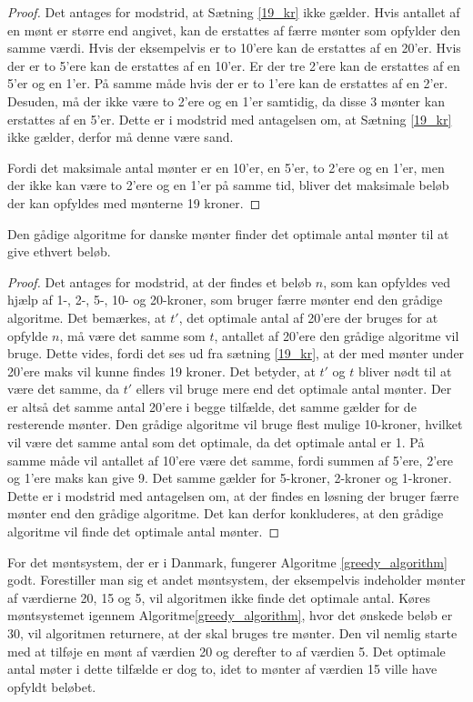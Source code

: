 \begin{proof}
\label{19_kr_bevis}
Det antages for modstrid, at Sætning \ref{19_kr} ikke gælder.
Hvis antallet af en mønt er større end angivet, kan de erstattes af færre mønter som opfylder den samme værdi. 
Hvis der eksempelvis er to 10'ere kan de erstattes af en 20'er. 
Hvis der er to 5'ere kan de erstattes af en 10'er. 
Er der tre 2'ere kan de erstattes af en 5'er og en 1'er. 
På samme måde hvis der er to 1'ere kan de erstattes af en 2'er.
Desuden, må der ikke være to 2'ere og en 1'er samtidig, da disse 3 mønter kan erstattes af en 5'er. 
Dette er i modstrid med antagelsen om, at Sætning \ref{19_kr} ikke gælder, derfor må denne være sand. 

Fordi det maksimale antal mønter er en 10'er, en 5'er, to 2'ere og en 1'er, men der ikke kan være to 2'ere og en 1'er på samme tid, bliver det maksimale beløb der kan opfyldes med mønterne 19 kroner. 
\end{proof}

\begin{thm}
\label{gradig_satning}
Den gådige algoritme for danske mønter finder det optimale antal mønter til at give ethvert beløb.
\end{thm}

\begin{proof}
\label{gradig_bevis}
Det antages for modstrid, at der findes et beløb $n$, som kan opfyldes ved hjælp af 1-, 2-, 5-, 10- og 20-kroner, som bruger færre mønter end den grådige algoritme. 
Det bemærkes, at $t'$, det optimale antal af 20'ere der bruges for at opfylde $n$, må være det samme som $t$, antallet af 20'ere den grådige algoritme vil bruge. 
Dette vides, fordi det ses ud fra sætning \ref{19_kr}, at der med mønter under 20'ere maks vil kunne findes 19 kroner. 
Det betyder, at $t'$ og $t$ bliver nødt til at være det samme, da $t'$ ellers vil bruge mere end det optimale antal mønter. 
Der er altså det samme antal 20'ere i begge tilfælde, det samme gælder for de resterende mønter. 
Den grådige algoritme vil bruge flest mulige 10-kroner, hvilket vil være det samme antal som det optimale, da det optimale antal er 1. 
På samme måde vil antallet af 10'ere være det samme, fordi summen af 5'ere, 2'ere og 1'ere maks kan give 9.
Det samme gælder for 5-kroner, 2-kroner og 1-kroner. 
Dette er i modstrid med antagelsen om, at der findes en løsning der bruger færre mønter end den grådige algoritme.
Det kan derfor konkluderes, at den grådige algoritme vil finde det optimale antal mønter.

\end{proof}

\noindent For det møntsystem, der er i Danmark, fungerer Algoritme \ref{greedy_algorithm} godt. 
Forestiller man sig et andet møntsystem, der eksempelvis indeholder mønter af værdierne 20, 15 og 5, vil algoritmen ikke finde det optimale antal. 
Køres møntsystemet igennem Algoritme\ref{greedy_algorithm}, hvor det ønskede beløb er 30, vil algoritmen returnere, at der skal bruges tre mønter. 
Den vil nemlig starte med at tilføje en mønt af værdien 20 og derefter to af værdien 5.
Det optimale antal møter i dette tilfælde er dog to, idet to mønter af værdien 15 ville have opfyldt beløbet.
%